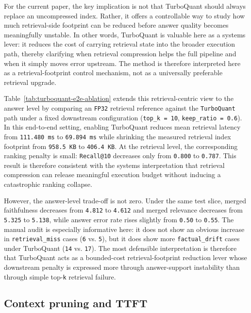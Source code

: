 \documentclass[10pt,twocolumn]{article}
\begin{document}
For the current paper, the key implication is not that TurboQuant should always replace an uncompressed index. Rather, it offers a controllable way to study how much retrieval-side footprint can be reduced before answer quality becomes meaningfully unstable. In other words, TurboQuant is valuable here as a systems lever: it reduces the cost of carrying retrieval state into the broader execution path, thereby clarifying when retrieval compression helps the full pipeline and when it simply moves error upstream. The method is therefore interpreted here as a retrieval-footprint control mechanism, not as a universally preferable retrieval upgrade.



Table~\ref{tab:turboquant-e2e-ablation} extends this retrieval-centric view to the answer level by comparing an \texttt{FP32} retrieval reference against the \texttt{TurboQuant} path under a fixed downstream configuration (\texttt{top\_k = 10}, \texttt{keep\_ratio = 0.6}). In this end-to-end setting, enabling TurboQuant reduces mean retrieval latency from \texttt{111.480 ms} to \texttt{69.894 ms} while shrinking the measured retrieval index footprint from \texttt{958.5 KB} to \texttt{406.4 KB}. At the retrieval level, the corresponding ranking penalty is small: \texttt{Recall@10} decreases only from \texttt{0.800} to \texttt{0.787}. This result is therefore consistent with the systems interpretation that retrieval compression can release meaningful execution budget without inducing a catastrophic ranking collapse.

However, the answer-level trade-off is not zero. Under the same test slice, merged faithfulness decreases from \texttt{4.812} to \texttt{4.612} and merged relevance decreases from \texttt{5.325} to \texttt{5.138}, while answer error rate rises slightly from \texttt{0.50} to \texttt{0.55}. The manual audit is especially informative here: it does not show an obvious increase in \texttt{retrieval\_miss} cases (\texttt{6} vs. \texttt{5}), but it does show more \texttt{factual\_drift} cases under TurboQuant (\texttt{14} vs. \texttt{17}). The most defensible interpretation is therefore that TurboQuant acts as a bounded-cost retrieval-footprint reduction lever whose downstream penalty is expressed more through answer-support instability than through simple top-\texttt{k} retrieval failure.

\subsection{Context pruning and TTFT}
\end{document}
